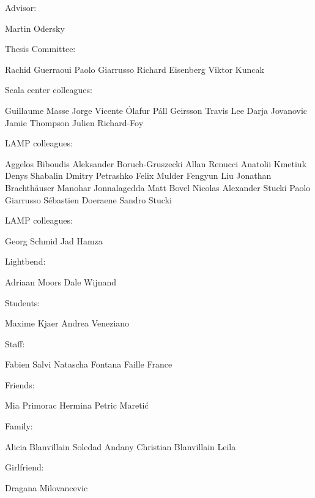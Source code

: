 Advisor:

Martin Odersky

Thesis Committee:

Rachid Guerraoui
Paolo Giarrusso
Richard Eisenberg
Viktor Kuncak

Scala center colleagues:

Guillaume Masse
Jorge Vicente
Ólafur Páll Geirsson
Travis Lee
Darja Jovanovic
Jamie Thompson
Julien Richard-Foy

LAMP colleagues:

Aggelos Biboudis
Aleksander Boruch-Gruszecki
Allan Renucci
Anatolii Kmetiuk
Denys Shabalin
Dmitry Petrashko
Felix Mulder
Fengyun Liu
Jonathan Brachthäuser
Manohar Jonnalagedda
Matt Bovel
Nicolas Alexander Stucki
Paolo Giarrusso
Sébastien Doeraene
Sandro Stucki

LAMP colleagues:

Georg Schmid
Jad Hamza

Lightbend:

Adriaan Moors
Dale Wijnand

Students:

Maxime Kjaer
Andrea Veneziano

Staff:

Fabien Salvi
Natascha Fontana
Faille France

Friends:

Mia Primorac
Hermina Petric Maretić

Family:

Alicia Blanvillain
Soledad Andany
Christian Blanvillain
Leila

Girlfriend:

Dragana Milovancevic
